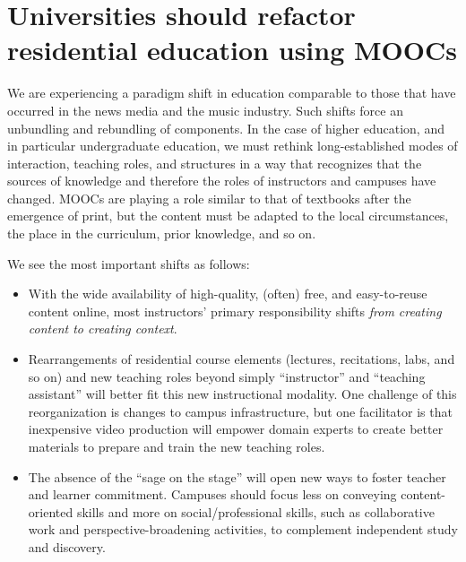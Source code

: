 \section{Universities should refactor residential education using MOOCs}



We are experiencing a paradigm shift in education comparable to those
that have occurred in the news media and the music industry.   Such
shifts force an unbundling and rebundling of components. In the
case of higher education, and in particular undergraduate education,
we must rethink long-established modes of interaction, teaching roles,
and structures in a way that recognizes
that the sources of knowledge and therefore the roles of instructors and
campuses have changed.
MOOCs are playing a role similar to that of textbooks after the
emergence of print, but the content must be adapted to the local circumstances,
the place in the curriculum, prior knowledge, and so on.

We see the most important shifts as follows:

\begin{itemize}

\item With the wide availability of high-quality, (often) free, and
easy-to-reuse content online, most instructors' primary responsibility
shifts \emph{from creating content to creating context}.

\item Rearrangements of residential course elements (lectures,
  recitations, labs, and so on) and new teaching roles beyond simply ``instructor''
  and ``teaching assistant'' will better fit this new instructional
  modality.  One challenge of this reorganization is changes to campus
  infrastructure, but one facilitator is that inexpensive video production
  will empower domain experts to create 
  better materials to prepare and train the new teaching roles.

\item The absence of the ``sage on the stage'' will open new ways to
foster teacher and learner commitment.  Campuses should
focus less on conveying content-oriented skills and more on
social/professional skills, such as collaborative work and
perspective-broadening activities, to complement  independent study
and discovery.

\end{itemize} 

